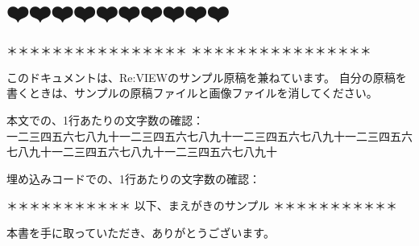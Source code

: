 \chapter{❤️❤️❤️❤️❤️❤️❤️❤️❤️❤️}
\label{chap:chap00-preface}

\begin{center}
＊＊＊＊＊＊＊＊＊＊＊＊＊＊＊＊  ＊＊＊＊＊＊＊＊＊＊＊＊＊＊＊＊
\end{center}

このドキュメントは、Re:VIEWのサンプル原稿を兼ねています。
自分の原稿を書くときは、サンプルの原稿ファイルと画像ファイルを消してください。

\begin{starterterminal}\end{starterterminal}

本文での、1行あたりの文字数の確認：\\{}
一二三四五六七八九十一二三四五六七八九十一二三四五六七八九十一二三四五六七八九十一二三四五六七八九十一二三四五六七八九十

埋め込みコードでの、1行あたりの文字数の確認：

\begin{starterprogram}\end{starterprogram}

\begin{center}
＊＊＊＊＊＊＊＊＊＊＊ 以下、まえがきのサンプル ＊＊＊＊＊＊＊＊＊＊＊\\{}
\end{center}

本書を手に取っていただき、ありがとうございます。

